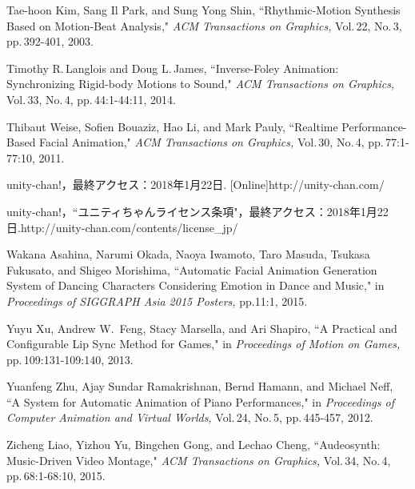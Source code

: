 \begin{thebibliography}{55}
Tae-hoon Kim, Sang Il Park, and Sung Yong Shin,
 ``Rhythmic-Motion Synthesis Based on Motion-Beat Analysis,"
\textit{ACM Transactions on Graphics,} Vol.\,22, No.\,3, pp.\,392-401, 2003.

Timothy R.\,Langlois and Doug L.\,James,
 ``Inverse-Foley Animation: Synchronizing Rigid-body Motions to Sound,"
 \textit{ACM Transactions on Graphics,} Vol.\,33, No.\,4, pp.\,44:1-44:11, 2014.

Thibaut Weise, Sofien Bouaziz, Hao Li, and Mark Pauly,
 ``Realtime Performance-Based Facial Animation,"
 \textit{ACM Transactions on Graphics,} Vol.\,30, No.\,4, pp.\,77:1-77:10, 2011.

unity-chan!，最終アクセス：2018年1月22日.
[Online]http://unity-chan.com/

unity-chan!，``ユニティちゃんライセンス条項"，最終アクセス：2018年1月22日.\newline
[Online]http://unity-chan.com/contents/license\_jp/

Wakana Asahina, Narumi Okada, Naoya Iwamoto, Taro Masuda, Tsukasa Fukusato, and Shigeo Morishima,
 ``Automatic Facial Animation Generation System of Dancing Characters Considering Emotion in Dance and Music,"
 in \textit{Proceedings of SIGGRAPH Asia 2015 Posters,} pp.11:1, 2015.

Yuyu Xu, Andrew W.\, Feng, Stacy Marsella, and Ari Shapiro,
 ``A Practical and Configurable Lip Sync Method for Games,"
 in \textit{Proceedings of Motion on Games,} pp.\,109:131-109:140, 2013.

Yuanfeng Zhu, Ajay Sundar Ramakrishnan, Bernd Hamann, and Michael Neff,
 ``A System for Automatic Animation of Piano Performances,"
  in \textit{Proceedings of Computer Animation and Virtual Worlds,} Vol.\,24, No.\,5, pp.\,445-457, 2012.

Zicheng Liao, Yizhou Yu, Bingchen Gong, and Lechao Cheng,
 ``Audeosynth: Music-Driven Video Montage,"
 \textit{ACM Transactions on Graphics,} Vol.\,34, No.\,4, pp.\,68:1-68:10, 2015.

\end{thebibliography}
